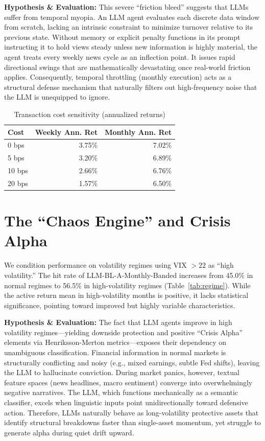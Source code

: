 \documentclass[12pt]{report}
\begin{document}
\textbf{Hypothesis \& Evaluation:} This severe ``friction bleed'' suggests that LLMs suffer from temporal myopia. An LLM agent evaluates each discrete data window from scratch, lacking an intrinsic constraint to minimize turnover relative to its previous state. Without memory or explicit penalty functions in its prompt instructing it to hold views steady unless new information is highly material, the agent treats every weekly news cycle as an inflection point. It issues rapid directional swings that are mathematically devastating once real-world friction applies. Consequently, temporal throttling (monthly execution) acts as a structural defense mechanism that naturally filters out high-frequency noise that the LLM is unequipped to ignore.

\begin{table}[H]
    \centering
    \caption{Transaction cost sensitivity (annualized returns)}
    \label{tab:frictions}
    \begin{tabular}{lrr}
        \toprule
        Cost   & Weekly Ann. Ret & Monthly Ann. Ret \\
        \midrule
        0 bps  & 3.75\%          & 7.02\%           \\
        5 bps  & 3.20\%          & 6.89\%           \\
        10 bps & 2.66\%          & 6.76\%           \\
        20 bps & 1.57\%          & 6.50\%           \\
        \bottomrule
    \end{tabular}
\end{table}

\section{The ``Chaos Engine'' and Crisis Alpha}
We condition performance on volatility regimes using VIX $> 22$ as ``high volatility.''
The hit rate of LLM-BL-A-Monthly-Banded increases from 45.0\% in normal regimes to 56.5\% in high-volatility regimes (Table~\ref{tab:regime}).
While the active return mean in high-volatility months is positive, it lacks statistical significance, pointing toward improved but highly variable characteristics.

\textbf{Hypothesis \& Evaluation:} The fact that LLM agents improve in high volatility regimes---yielding downside protection and positive ``Crisis Alpha'' elements via Henriksson-Merton metrics---exposes their dependency on unambiguous classification. Financial information in normal markets is structurally conflicting and noisy (e.g., mixed earnings, subtle Fed shifts), leaving the LLM to hallucinate conviction. During market panics, however, textual feature spaces (news headlines, macro sentiment) converge into overwhelmingly negative narratives. The LLM, which functions mechanically as a semantic classifier, excels when linguistic inputs point unidirectionally toward defensive action. Therefore, LLMs naturally behave as long-volatility protective assets that identify structural breakdowns faster than single-asset momentum, yet struggle to generate alpha during quiet drift upward.
\end{document}
